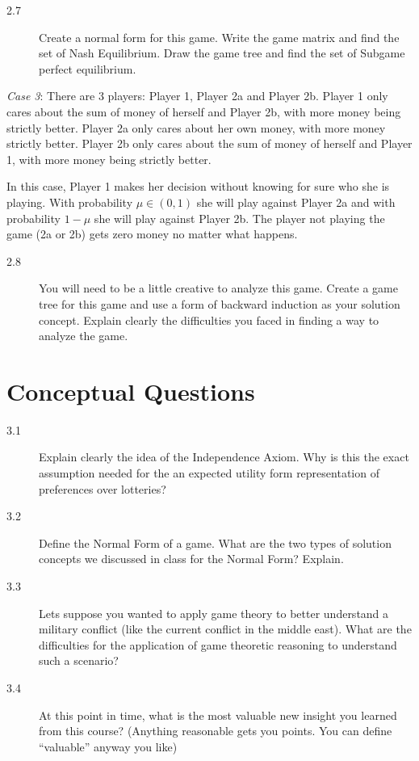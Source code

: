 \documentclass[11pt]{article}
\begin{document}
\begin{description}
\item[2.7] Create a normal form for this game. Write the game matrix and find the set of Nash Equilibrium. Draw the game tree and find the set of Subgame perfect equilibrium.
\end{description}

\emph{Case 3}: There are 3 players: Player 1, Player 2a and Player 2b. Player 1 only cares about the sum of money of herself and Player 2b, with more money being strictly better. Player 2a only cares about her own money, with more money strictly better. Player 2b only cares about the sum of money of herself and Player 1, with more money being strictly better.

In this case, Player 1 makes her decision without knowing for sure who she is playing. With probability $\mu\in(0,1)$ she will play against Player 2a and with probability $1-\mu$ she will play against Player 2b. The player not playing the game (2a or 2b) gets zero money no matter what happens.

\newpage
\begin{description}
\item[2.8] You will need to be a little creative to analyze this game. Create a game tree for this game and use a form of backward induction as your solution concept. Explain clearly the difficulties you faced in finding a way to analyze the game.
\end{description}

\section{Conceptual Questions}

\begin{description}
\item[3.1] Explain clearly the idea of the Independence Axiom. Why is this the exact assumption needed for the an expected utility form representation of preferences over lotteries?
\item[3.2] Define the Normal Form of a game. What are the two types of solution concepts we discussed in class for the Normal Form? Explain.
\item[3.3] Lets suppose you wanted to apply game theory to better understand a military conflict (like the current conflict in the middle east). What are the difficulties for the application of game theoretic reasoning to understand such a scenario?
\item[3.4] At this point in time, what is the most valuable new insight you learned from this course? (Anything reasonable gets you points. You can define ``valuable'' anyway you like)
\end{description}
\end{document}
